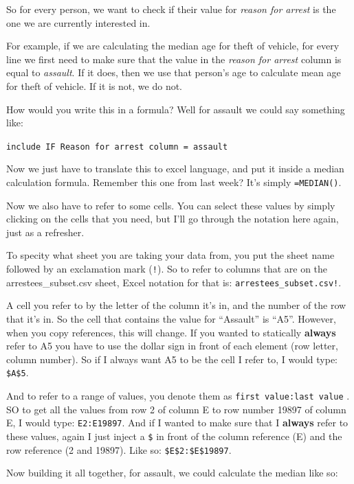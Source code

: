 \documentclass[]{book}
\theoremstyle{definition}
\theoremstyle{definition}
\theoremstyle{definition}
\theoremstyle{remark}
\begin{document}
So for every person, we want to check if their value for \emph{reason
for arrest} is the one we are currently interested in.

For example, if we are calculating the median age for theft of vehicle,
for every line we first need to make sure that the value in the
\emph{reason for arrest} column is equal to \emph{assault}. If it does,
then we use that person's age to calculate mean age for theft of
vehicle. If it is not, we do not.

How would you write this in a formula? Well for assault we could say
something like:

\texttt{include\ IF\ \textquotesingle{}Reason\ for\ arrest\ column\textquotesingle{}\ =\ \textquotesingle{}assault\textquotesingle{}}

Now we just have to translate this to excel language, and put it inside
a median calculation formula. Remember this one from last week? It's
simply \texttt{=MEDIAN()}.

Now we also have to refer to some cells. You can select these values by
simply clicking on the cells that you need, but I'll go through the
notation here again, just as a refresher.

To specity what sheet you are taking your data from, you put the sheet
name followed by an exclamation mark (\texttt{!}). So to refer to
columns that are on the arrestees\_subset.csv sheet, Excel notation for
that is: \texttt{arrestees\_subset.csv!}.

A cell you refer to by the letter of the column it's in, and the number
of the row that it's in. So the cell that contains the value for
``Assault'' is ``A5''. However, when you copy references, this will
change. If you wanted to statically \textbf{always} refer to A5 you have
to use the dollar sign in front of each element (row letter, column
number). So if I always want A5 to be the cell I refer to, I would type:
\texttt{\$A\$5}.

And to refer to a range of values, you denote them as
\texttt{first\ value:last\ value} . SO to get all the values from row 2
of column E to row number 19897 of column E, I would type:
\texttt{E2:E19897}. And if I wanted to make sure that I \textbf{always}
refer to these values, again I just inject a \texttt{\$} in front of the
column reference (E) and the row reference (2 and 19897). Like so:
\texttt{\$E\$2:\$E\$19897}.

Now building it all together, for assault, we could calculate the median
like so:
\end{document}
